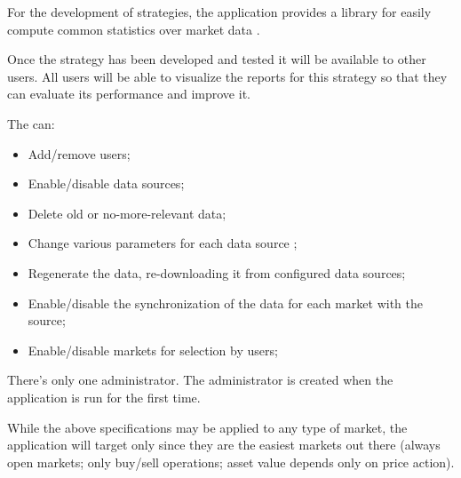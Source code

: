 For the development of strategies, the application provides a library for easily
compute common statistics over market data .

Once the strategy has been developed and tested it will be available to other
users. All users will be able to visualize the reports for this strategy so that
they can evaluate its performance and improve it.

The  can:
\begin{itemize}
	\item Add/remove users;
	\item Enable/disable data sources;
	\item Delete old or no-more-relevant data;
	\item Change various parameters for each data source ;
	\item Regenerate the data, re-downloading it from configured data
		sources;
	\item Enable/disable the synchronization of the data for each market
		with the source;
	\item Enable/disable markets for selection by users;
\end{itemize}

There's only one administrator. The administrator is created when the
application is run for the first time.

While the above specifications may be applied to any type of market, the
application will target only  since they are
the easiest markets out there (always open markets; only buy/sell operations;
asset value depends only on price action).
